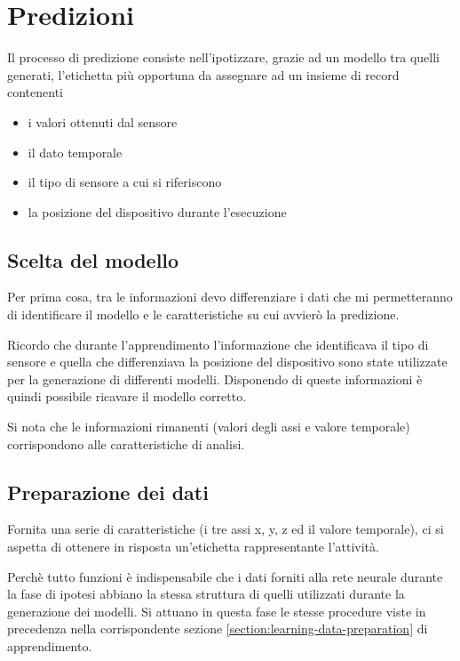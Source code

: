 \section{Predizioni}
Il processo di predizione consiste nell'ipotizzare, grazie ad un modello tra quelli generati, 
l'etichetta più opportuna da assegnare ad un insieme di record contenenti
\begin{itemize}
    \item i valori ottenuti dal sensore
    \item il dato temporale
    \item il tipo di sensore a cui si riferiscono
    \item la posizione del dispositivo durante l'esecuzione
\end{itemize}


\subsection{Scelta del modello}
Per prima cosa, tra le informazioni devo differenziare i dati che mi permetteranno di identificare il modello e le caratteristiche 
su cui avvierò la predizione.

Ricordo che durante l'apprendimento l'informazione che identificava il tipo di sensore e quella che differenziava 
la posizione del dispositivo sono state utilizzate per la generazione di differenti modelli.
Disponendo di queste informazioni è quindi possibile ricavare il modello corretto.

Si nota che le informazioni rimanenti (valori degli assi e valore temporale) corrispondono alle caratteristiche di analisi.


\subsection{Preparazione dei dati}
Fornita una serie di caratteristiche (i tre assi x, y, z ed il valore temporale), ci si aspetta di ottenere 
in risposta un'etichetta rappresentante l'attività.

\vspace{5mm} %

Perchè tutto funzioni è indispensabile che i dati forniti alla rete neurale durante la fase di ipotesi 
abbiano la stessa struttura di quelli utilizzati durante la generazione dei modelli.
Si attuano in questa fase le stesse procedure viste in precedenza nella corrispondente sezione 
\ref{section:learning-data-preparation} di apprendimento.

